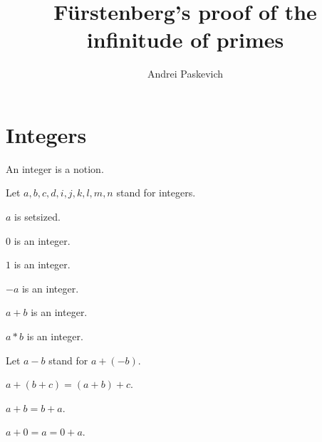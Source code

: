 \documentclass{document}
\title{Fürstenberg's proof of the infinitude of primes}
\author{Andrei Paskevich}
\date{}
\begin{document}

  \maketitle

  \section{Integers}

  \begin{forthel}

    \begin{signature}[Integers]
      An integer is a notion.
    \end{signature}

    Let $a,b,c,d,i,j,k,l,m,n$ stand for integers.

    \begin{axiom}
      $a$ is setsized.
    \end{axiom}

    \begin{signature}[IntZero]
      $0$ is an integer.
    \end{signature}

    \begin{signature}[IntOne]
      $1$ is an integer.
    \end{signature}

    \begin{signature}[IntNeg]
      $-a$ is an integer.
    \end{signature}

    \begin{signature}[IntPlus]
      $a + b$ is an integer.
    \end{signature}

    \begin{signature}[IntMult]
      $a * b$ is an integer.
    \end{signature}

    Let $a - b$ stand for $a + (-b)$.

    \begin{axiom}[AddAsso]
      $a + (b + c) = (a + b) + c$.
    \end{axiom}

    \begin{axiom}[AddComm]
      $a + b = b + a$.
    \end{axiom}

    \begin{axiom}[AddZero]
      $a + 0 = a = 0 + a$.
    \end{axiom}


\end{forthel}
\end{document}
